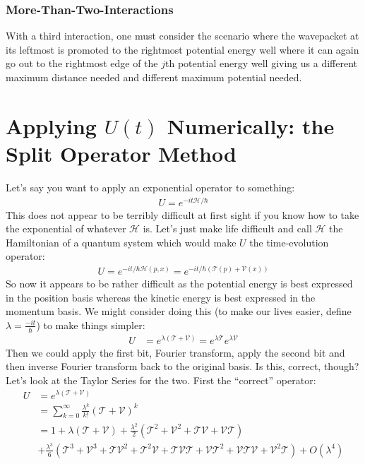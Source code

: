 \subsubsection{More-Than-Two-Interactions}
With a third interaction, one must consider the scenario where the wavepacket at its leftmost is promoted to the rightmost potential energy well where it can again go out to the rightmost edge of the $j$th potential energy well giving us a different maximum distance needed and different maximum potential needed.




\section{Applying $U(t)$ Numerically: the Split Operator Method}
Let's say you want to apply an exponential operator to something:
\begin{align*}
	U = e^{-i t \mathcal{H} / \hbar}
\end{align*}
This does not appear to be terribly difficult at first sight if you know how to take the exponential of whatever $\mathcal{H}$ is.  Let's just make life difficult and call $\mathcal{H}$ the Hamiltonian of a quantum system which would make $U$ the time-evolution operator:
\begin{align*}
	U = e^{-i t / \hbar \mathcal{H}(p, x) } = e^{-i t / \hbar (\mathcal{T}(p) + \mathcal{V}(x) ) }
\end{align*}
So now it appears to be rather difficult as the potential energy is best expressed in the position basis whereas the kinetic energy is best expressed in the momentum basis.  We might consider doing this (to make our lives easier, define $\lambda = \frac{- i t}{\hbar}$) to make things simpler:
\begin{align*}
	U &= e^{\lambda (\mathcal{T} + \mathcal{V} ) }  = e^{\lambda \mathcal{T} } e^{\lambda  \mathcal{V} }
\end{align*}
Then we could apply the first bit, Fourier transform, apply the second bit and then inverse Fourier transform back to the original basis.  Is this, correct, though?  Let's look at the Taylor Series for the two.  First the ``correct'' operator:
\begin{align*}
	U &= e^{\lambda (\mathcal{T} + \mathcal{V} ) } \\
	&= \sum_{k=0}^{\infty} \frac{\lambda^k}{k!} (\mathcal{T} + \mathcal{V} )^k \\
	&= 1 + \lambda (\mathcal{T} + \mathcal{V} ) + \frac{\lambda^2}{2}(\mathcal{T}^2 + \mathcal{V}^2  + \mathcal{T}\mathcal{V} + \mathcal{V}\mathcal{T}) \\
	&+ \frac{\lambda^3}{6}(\mathcal{T}^3+ \mathcal{V}^3 + \mathcal{T}\mathcal{V}^2 + \mathcal{T}^2\mathcal{V} + \mathcal{T}\mathcal{V}\mathcal{T} + \mathcal{V}\mathcal{T}^2 + \mathcal{V}\mathcal{T} \mathcal{V} + \mathcal{V}^2\mathcal{T}  ) + O(\lambda^4)
\end{align*}
